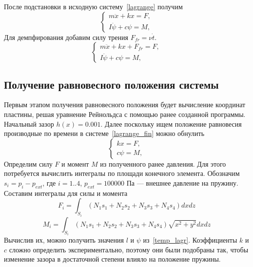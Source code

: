 \documentclass[a4paper,14pt]{extarticle}
\begin{document}
После подстановки в исходную систему~\eqref{lagrange} получим
\begin{equation*}
	\begin{cases*}
		m \ddot{x} + k x = F, \\
		I \ddot{\psi} + c \psi = M,
	\end{cases*}
\end{equation*}
Для демпфирования добавим силу трения $F_{fr} = \nu \dot{t}$.
\begin{equation}
	\begin{cases*}
		m \ddot{x} + k x + F_{fr} = F, \\
		I \ddot{\psi} + c \psi = M,
	\end{cases*}
	\label{lagrange_fin}
\end{equation}

\subsection{Получение равновесного положения системы}

Первым этапом получения равновесного положения будет вычисление координат пластины, решая уравнение Рейнольдса с помощью ранее созданной программы. Начальный зазор $h(x) = 0.001$.
Далее поскольку ищем положение равновесия производные по времени в системе~\eqref{lagrange_fin} можно обнулить
\begin{equation}
	\begin{cases*}
		k x = F, \\
		c \psi = M,
	\end{cases*}
\label{temp_lagr}
\end{equation}
Определим силу $F$ и момент $M$ из полученного ранее давления. Для этого потребуется вычислить интегралы по площади конечного элемента. Обозначим $s_i = p_i - p_{ext}$, где $i = 1..4$, $p_{ext} = 100000$ Па --- внешнее давление на пружину. Составим интегралы для силы и момента
\begin{equation*}
	F_i = \int_{S_i} { \left( N_1 s_1 + N_2 s_2 + N_3 s_3 + N_4 s_4 \right)  dx dz}
\end{equation*}
\begin{equation*}
	M_i = \int_{S_i} { \left( N_1 s_1 + N_2 s_2 + N_3 s_3 + N_4 s_4 \right) \sqrt{x^2 + y^2}  dx dz}
\end{equation*}
Вычислив их, можно получить значения $l$ и $\psi$ из~\eqref{temp_lagr}. Коэффициенты $k$ и $c$ сложно определить экспериментально, поэтому они были подобраны так, чтобы изменение зазора в достаточной степени влияло на положение пружины.
\end{document}
